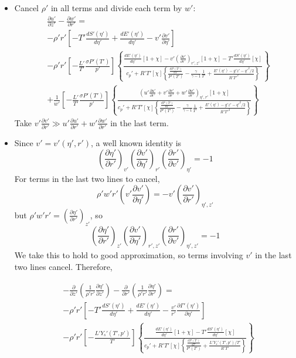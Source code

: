 \documentclass[preprint, prX]{revtex4}
\newcommand{\dd}[2]{\frac{d#1}{d#2}}
\newcommand{\pd}[2]{\frac{\partial#1}{\partial#2}}
\newcommand{\tpd}[3]{\left( \frac{\partial#1}{\partial#2} \right)_{#3}}
\newcommand{\gogmo}{\frac{\gamma}{\gamma-1}}
\begin{document}
\begin{itemize}
\item 
Cancel $\rho'$ in all terms and divide each term by $w'$:
\begin{equation}
\begin{split}
&\pd{u'}{z'} - \pd{w'}{r'} = \\
&-\rho'r'\left[ -T' \dd{S'(\eta')}{\eta'} +\dd{E'(\eta')}{\eta'}- v' \pd{v'}{\eta'} \right] \\
& - \rho' r' \left[ -\frac{L'}{T'}\frac{\sigma P'(T')}{p'} \right] \left\{ \frac{\dd{E'(\eta')}{\eta'}\left[ 1+\chi\right] - v'\tpd{v'}{r'}{r',z'}\left[ 1 + \chi \right] - T' \dd{S'(\eta')}{\eta'}[\chi]}{c_p'+R'T'[\chi] \left\{ \frac{\dd{P'(T')}{T'}}{P'(T')} -\gogmo \frac{1}{T'} + \frac{E'(\eta') - g'z' - q'^2/2}{R'T'^2} \right\} }\right\} \\
&+ \frac{1}{w'} \left[ -\frac{L'}{T'}\frac{\sigma P'(T')}{p'} \right] \left\{ \frac{ \left( u'\pd{u'}{r'} +v'\pd{v'}{r'} + w'\pd{w'}{r'} \right)_{\eta',r'} [1+\chi] }{c_p' + R'T'[\chi] \left\{ \frac{\dd{P'(T')}{T'}}{P'(T')} -\gogmo \frac{1}{T'} + \frac{E'(\eta') - g'z' - q'^2/2}{R'T'^2} \right \} }	\right\}
\end{split}
\end{equation}
Take $v'\pd{v'}{r'} \gg u'\pd{u'}{r'} + w'\pd{w'}{r'}$ in the last term.
\item
Since $v' = v'(\eta',r')$, a well known identity is
\begin{equation}
\tpd{\eta'}{r'}{v'}\tpd{v'}{\eta'}{r'}\tpd{r'}{v'}{\eta'} = -1
\end{equation}
For terms in the last two lines to cancel,
\begin{equation}
\rho'w'r'\left(v'\pd{v'}{\eta'} \right) = -v'\tpd{v'}{r'}{\eta',z'}
\end{equation}
but $\rho'w'r' = \tpd{\eta'}{r'}{z'}$, so
\begin{equation}
\tpd{\eta'}{r'}{z'}\tpd{v'}{\eta'}{r',z'}\tpd{r'}{v'}{\eta',z'} = -1
\end{equation}
We take this to hold to good approximation, so terms involving $v'$ in the last two lines cancel. Therefore,

\begin{equation}
\begin{split}
&-\pd{}{z'}\left( \frac{1}{\rho' r'} \pd{\eta'}{z'}\right) - \pd{}{r'}\left(\frac{1}{\rho'r'} \pd{\eta'}{r'}\right) =\\
&-\rho'r'\left[ -T' \dd{S'(\eta')}{\eta'} +\dd{E'(\eta')}{\eta'}- \frac{v'}{r'} \pd{\Gamma'(\eta')}{\eta'} \right] \\
& - \rho' r' \left[ -\frac{L'Y_s'(T',p')}{T'} \right] \left\{ \frac{\dd{E'(\eta')}{\eta'}\left[ 1+\chi\right]  - T' \dd{S'(\eta')}{\eta'}[\chi]}{c_p'+R'T'[\chi] \left\{ \frac{\dd{P'(T')}{T'}}{P'(T')} +\frac{L'Y_s'(T',p')/T'}{R' T'} \right\} }\right\} \\
\end{split}
\end{equation}


\end{itemize}
\end{document}
